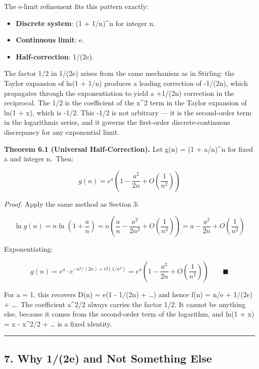 \documentclass[
]{article}
\providecommand{\tightlist}{%
  \setlength{\itemsep}{0pt}\setlength{\parskip}{0pt}}
\begin{document}
The e-limit refinement fits this pattern exactly:

\begin{itemize}
\tightlist
\item
  \textbf{Discrete system}: (1 + 1/n)\^{}n for integer n.
\item
  \textbf{Continuous limit}: e.
\item
  \textbf{Half-correction}: 1/(2e).
\end{itemize}

The factor 1/2 in 1/(2e) arises from the same mechanism as in Stirling:
the Taylor expansion of ln(1 + 1/n) produces a leading correction of
-1/(2n), which propagates through the exponentiation to yield a +1/(2n)
correction in the reciprocal. The 1/2 is the coefficient of the x\^{}2
term in the Taylor expansion of ln(1 + x), which is -1/2. This -1/2 is
not arbitrary --- it is the second-order term in the logarithmic series,
and it governs the first-order discrete-continuous discrepancy for any
exponential limit.

\textbf{Theorem 6.1 (Universal Half-Correction).} Let g(n) = (1 +
a/n)\^{}n for fixed a and integer n.~Then:

\[g(n) = e^a\!\left(1 - \frac{a^2}{2n} + O\!\left(\frac{1}{n^2}\right)\right)\]

\emph{Proof.} Apply the same method as Section 3:

\[\ln g(n) = n\ln\!\left(1 + \frac{a}{n}\right) = n\left(\frac{a}{n} - \frac{a^2}{2n^2} + O\!\left(\frac{1}{n^3}\right)\right) = a - \frac{a^2}{2n} + O\!\left(\frac{1}{n^2}\right)\]

Exponentiating:

\[g(n) = e^a \cdot e^{-a^2/(2n) + O(1/n^2)} = e^a\!\left(1 - \frac{a^2}{2n} + O\!\left(\frac{1}{n^2}\right)\right) \qquad \blacksquare\]

For a = 1, this recovers D(n) = e(1 - 1/(2n) + \ldots) and hence f(n) =
n/e + 1/(2e) + \ldots. The coefficient a\^{}2/2 always carries the
factor 1/2. It cannot be anything else, because it comes from the
second-order term of the logarithm, and ln(1 + x) = x - x\^{}2/2 +
\ldots{} is a fixed identity.

\begin{center}\rule{0.5\linewidth}{0.5pt}\end{center}

\subsection{7. Why 1/(2e) and Not Something
Else}\label{why-12e-and-not-something-else}
\end{document}
